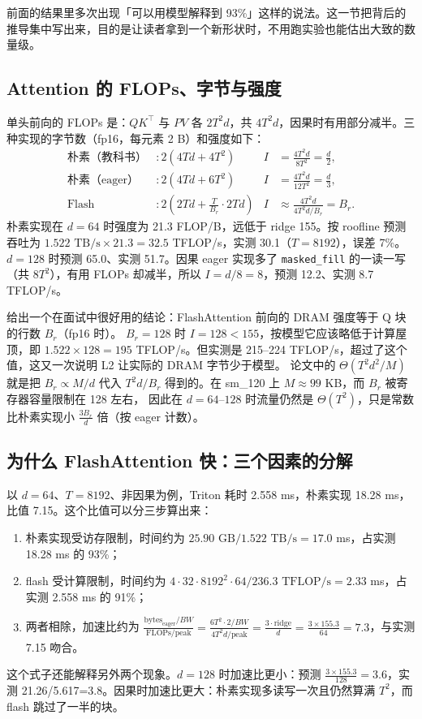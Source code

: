 \documentclass[11pt,a4paper]{ctexart}
\begin{document}
前面的结果里多次出现「可以用模型解释到 93\%」这样的说法。这一节把背后的推导集中写出来，目的是让读者拿到一个新形状时，不用跑实验也能估出大致的数量级。

\subsection{Attention 的 FLOPs、字节与强度}
单头前向的 FLOPs 是：$QK^\top$ 与 $PV$ 各 $2T^2d$，共 $4T^2d$，因果时有用部分减半。三种实现的字节数（fp16，每元素 2 B）和强度如下：
\begin{align}
\text{朴素（教科书）}&: 2(4Td+4T^2) & I&=\frac{4T^2d}{8T^2}=\frac{d}{2},\\
\text{朴素（eager）}&: 2(4Td+6T^2) & I&=\frac{4T^2d}{12T^2}=\frac{d}{3},\\
\text{Flash}&: 2\left(2Td+\frac{T}{B_r}\cdot 2Td\right) & I&\approx\frac{4T^2d}{4T^2d/B_r}=B_r.\label{eq:flashI}
\end{align}
朴素实现在 $d=64$ 时强度为 21.3 FLOP/B，远低于 ridge 155。按 roofline 预测吞吐为 $1.522\text{ TB/s}\times21.3=32.5$ TFLOP/s，实测 30.1（$T=8192$），误差 7\%。
$d=128$ 时预测 65.0、实测 51.7。因果 eager 实现多了 \texttt{masked\_fill} 的一读一写（共 $8T^2$），有用 FLOPs 却减半，所以 $I=d/8=8$，预测 12.2、实测 8.7 TFLOP/s。

 给出一个在面试中很好用的结论：FlashAttention 前向的 DRAM 强度等于 Q 块的行数 $B_r$（fp16 时）。
$B_r=128$ 时 $I=128<155$，按模型它应该略低于计算屋顶，即 $1.522\times128=195$ TFLOP/s。但实测是 215–224 TFLOP/s，超过了这个值，这又一次说明 L2 让实际的 DRAM 字节少于模型。
论文中的 $\Theta(T^2d^2/M)$ 就是把 $B_r\propto M/d$ 代入 $T^2d/B_r$ 得到的。在 sm\_120 上 $M\approx99$ KB，而 $B_r$ 被寄存器容量限制在 128 左右，
因此在 $d=64$–$128$ 时流量仍然是 $\Theta(T^2)$，只是常数比朴素实现小 $\frac{3B_r}{d}$ 倍（按 eager 计数）。

\subsection{为什么 FlashAttention 快：三个因素的分解}
以 $d=64$、$T=8192$、非因果为例，Triton 耗时 2.558 ms，朴素实现 18.28 ms，比值 7.15。这个比值可以分三步算出来：
\begin{enumerate}
\item 朴素实现受访存限制，时间约为 $25.90\text{ GB}/1.522\text{ TB/s}=17.0$ ms，占实测 18.28 ms 的 93\%；
\item flash 受计算限制，时间约为 $4\cdot32\cdot8192^2\cdot64/236.3\text{ TFLOP/s}=2.33$ ms，占实测 2.558 ms 的 91\%；
\item 两者相除，加速比约为 $\frac{\text{bytes}_{\text{eager}}/BW}{\text{FLOPs}/\text{peak}}=\frac{6T^2\cdot2/BW}{4T^2d/\text{peak}}=\frac{3\cdot\text{ridge}}{d}=\frac{3\times155.3}{64}=7.3$，与实测 7.15 吻合。
\end{enumerate}
这个式子还能解释另外两个现象。$d=128$ 时加速比更小：预测 $\frac{3\times155.3}{128}=3.6$，实测 21.26/5.617=3.8。因果时加速比更大：朴素实现多读写一次且仍然算满 $T^2$，而 flash 跳过了一半的块。
\end{document}
